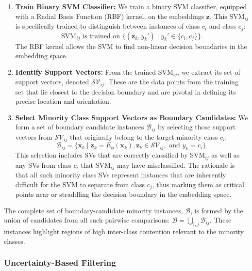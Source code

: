 \documentclass{article}
\begin{document}
\begin{enumerate}
    \item \textbf{Train Binary SVM Classifier:} We train a binary SVM classifier, equipped with a Radial Basis Function (RBF) kernel, on the embeddings $\mathbf{z}$. This SVM$_{ij}$ is specifically trained to distinguish between instances of class $c_i$ and class $c_j$:
    \begin{equation}
    \text{SVM}_{ij} \text{ is trained on } \{ (\mathbf{z}_k, y_k') \mid y_k' \in \{c_i, c_j\} \}.
    \end{equation}
    The RBF kernel allows the SVM to find non-linear decision boundaries in the embedding space.

    \item \textbf{Identify Support Vectors:} From the trained SVM$_{ij}$, we extract its set of support vectors, denoted $\mathcal{SV}_{ij}$. These are the data points from the training set that lie closest to the decision boundary and are pivotal in defining its precise location and orientation.

    \item \textbf{Select Minority Class Support Vectors as Boundary Candidates:} We form a set of boundary candidate instances $\mathcal{B}_{ij}$ by selecting those support vectors from $\mathcal{SV}_{ij}$ that originally belong to the target minority class $c_i$:
    \begin{equation}
    \mathcal{B}_{ij} = \{\mathbf{x}_k \mid \mathbf{z}_k = E_\phi(\mathbf{x}_k), \mathbf{z}_k \in \mathcal{SV}_{ij}, \text{ and } y_k = c_i\}.
    \end{equation}
    This selection includes SVs that are correctly classified by SVM$_{ij}$ as well as any SVs from class $c_i$ that SVM$_{ij}$ may have misclassified. The rationale is that all such minority class SVs represent instances that are inherently difficult for the SVM to separate from class $c_j$, thus marking them as critical points near or straddling the decision boundary in the embedding space.
\end{enumerate}
The complete set of boundary-candidate minority instances, $\mathcal{B}$, is formed by the union of candidates from all such pairwise comparisons: $\mathcal{B} = \bigcup_{i,j} \mathcal{B}_{ij}$. These instances highlight regions of high inter-class contention relevant to the minority classes.

\subsubsection{Uncertainty-Based Filtering}
\label{sssec:uncertainty_filtering}
\end{document}
